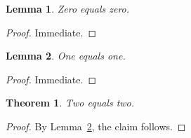 \newtheorem{lemma}{Lemma}
\newtheorem{theorem}{Theorem}

\begin{lemma}\label{lem:ambiguous}
Zero equals zero.
\end{lemma}
\begin{proof}
Immediate.
\end{proof}

\begin{lemma}\label{lem:ambiguous}
One equals one.
\end{lemma}
\begin{proof}
Immediate.
\end{proof}

\begin{theorem}\label{thm:ambiguous-reference-target}
Two equals two.
\end{theorem}
\begin{proof}
By Lemma~\ref{lem:ambiguous}, the claim follows.
\end{proof}
